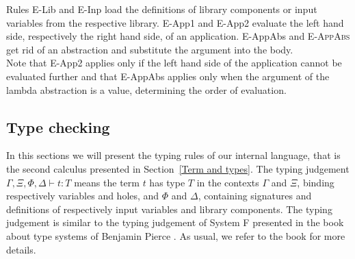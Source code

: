 Rules E-Lib and E-Inp load the definitions of library components or input variables from the respective library. E-App1 and E-App2 evaluate the left hand side, respectively the right hand side, of an application. E-AppAbs and \textsc{E-AppAbs} get rid of an abstraction and substitute the argument into the body.\\
Note that E-App2 applies only if the left hand side of the application cannot be evaluated further and that E-AppAbs applies only when the argument of the lambda abstraction is a value, determining the order of evaluation.

\subsection{Type checking}

In this sections we will present the typing rules of our internal language, that is the second calculus presented in Section~\ref{Term and types}. The typing judgement $\Gamma, \Xi, \Phi, \Delta \vdash t : T$ means the term $t$ has type $T$ in the contexts $\Gamma$ and $\Xi$, binding respectively variables and holes, and $\Phi$ and $\Delta$, containing signatures and definitions of respectively input variables and library components. The typing judgement is similar to the typing judgement of System F presented in the book about type systems of Benjamin Pierce \cite{pierce2002types}. As usual, we refer to the book for more details.
  
\begin{prooftree}
\end{prooftree}

\begin{prooftree}
\end{prooftree}

\begin{prooftree}
\end{prooftree}

\begin{prooftree}
\end{prooftree}

\begin{prooftree}
\end{prooftree}

